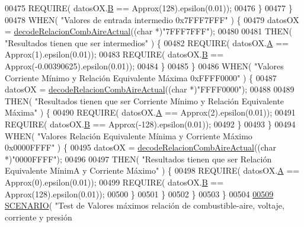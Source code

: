 \begin{DoxyCode}
{{{00475                 REQUIRE( datosOX.\hyperlink{structOxigenoResponse_a96b19152dd001e19d1351e2d97f22736}{B} == Approx(128).epsilon(0.01));
00476             \}
00477         \}
00478         WHEN( \textcolor{stringliteral}{"Valores de entrada intermedio 0x7FFF7FFF"} ) \{
00479             datosOX = \hyperlink{decoders_8cpp_a4cedb500095b25b3d4fff382094b0eb9}{decodeRelacionCombAireActual}((\textcolor{keywordtype}{char} *)\textcolor{stringliteral}{"7FFF7FFF"});
00480 
00481             THEN( \textcolor{stringliteral}{"Resultados tienen que ser intermedios"} ) \{
00482                 REQUIRE( datosOX.\hyperlink{structOxigenoResponse_a068c403e5746226cf22bb020b4c786d3}{A} == Approx(1).epsilon(0.01));
00483                 REQUIRE( datosOX.\hyperlink{structOxigenoResponse_a96b19152dd001e19d1351e2d97f22736}{B} == Approx(-0.00390625).epsilon(0.01));
00484             \}
00485         \}
00486         WHEN( \textcolor{stringliteral}{"Valores Corriente Mínimo y Relación Equivalente Máxima 0xFFFF0000"} ) \{
00487             datosOX = \hyperlink{decoders_8cpp_a4cedb500095b25b3d4fff382094b0eb9}{decodeRelacionCombAireActual}((\textcolor{keywordtype}{char} *)\textcolor{stringliteral}{"FFFF0000"});
00488 
00489             THEN( \textcolor{stringliteral}{"Resultados tienen que ser Corriente Mínimo y Relación Equivalente Máxima"} ) \{
00490                 REQUIRE( datosOX.\hyperlink{structOxigenoResponse_a068c403e5746226cf22bb020b4c786d3}{A} == Approx(2).epsilon(0.01));
00491                 REQUIRE( datosOX.\hyperlink{structOxigenoResponse_a96b19152dd001e19d1351e2d97f22736}{B} == Approx(-128).epsilon(0.01));
00492             \}
00493         \}
00494         WHEN( \textcolor{stringliteral}{"Valores Relación Equivalente Mínima y Corriente Máximo 0x0000FFFF"} ) \{
00495             datosOX = \hyperlink{decoders_8cpp_a4cedb500095b25b3d4fff382094b0eb9}{decodeRelacionCombAireActual}((\textcolor{keywordtype}{char} *)\textcolor{stringliteral}{"0000FFFF"});
00496 
00497             THEN( \textcolor{stringliteral}{"Resultados tienen que ser Relación Equivalente MínimA y Corriente Máximo"} ) \{
00498                 REQUIRE( datosOX.\hyperlink{structOxigenoResponse_a068c403e5746226cf22bb020b4c786d3}{A} == Approx(0).epsilon(0.01));
00499                 REQUIRE( datosOX.\hyperlink{structOxigenoResponse_a96b19152dd001e19d1351e2d97f22736}{B} == Approx(128).epsilon(0.01));
00500             \}
00501         \}
00502     \}
00503 \}
00504 
\hyperlink{UnitTestCase_8cpp_a40a3028fa1222aa3915042e8d9c0c4d2}{00509} \hyperlink{UnitTestCase_8cpp_aa6afb62ebdd4c3e07996c995f623eb6b}{SCENARIO}( \textcolor{stringliteral}{"Test de Valores máximos relación de combustible-aire, voltaje, corriente y presión
}}}}
\end{DoxyCode}

